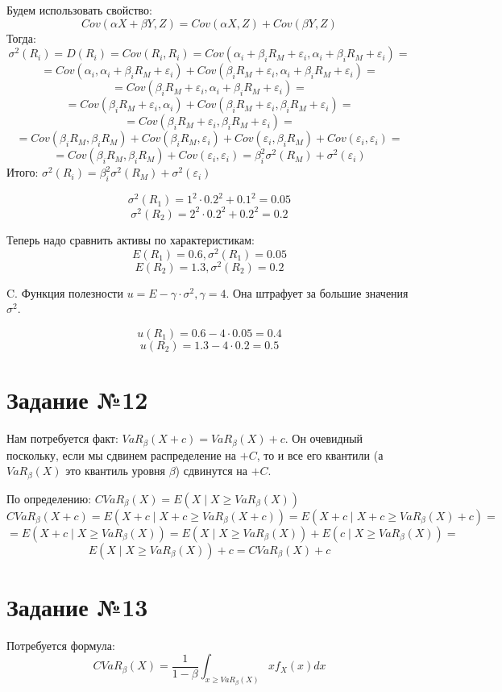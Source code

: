 \documentclass[a4paper,14pt]{extarticle}
\theoremstyle{definition}
\begin{document}
Будем использовать свойство: $$Cov(\alpha X + \beta Y, Z) = Cov(\alpha X, Z) + Cov(\beta Y, Z)$$
Тогда:
$$
\sigma^2(R_i) = D(R_i) = Cov(R_i, R_i) = Cov(\alpha_i + \beta_i R_M + \varepsilon_i, \alpha_i + \beta_i R_M + \varepsilon_i) =
$$
$$
=Cov(\alpha_i , \alpha_i + \beta_i R_M + \varepsilon_i) +
Cov(\beta_i R_M + \varepsilon_i , \alpha_i + \beta_i R_M + \varepsilon_i) =
$$
$$
=Cov(\beta_i R_M + \varepsilon_i , \alpha_i + \beta_i R_M + \varepsilon_i)=
$$
$$
=Cov(\beta_i R_M + \varepsilon_i , \alpha_i) +
Cov(\beta_i R_M + \varepsilon_i , \beta_i R_M + \varepsilon_i) = 
$$
$$
= Cov(\beta_i R_M + \varepsilon_i , \beta_i R_M + \varepsilon_i) =
$$
$$
= Cov(\beta_i R_M, \beta_i R_M) + Cov(\beta_i R_M, \varepsilon_i) + Cov(\varepsilon_i, \beta_i R_M) + Cov(\varepsilon_i, \varepsilon_i) =
$$
$$
= Cov(\beta_i R_M, \beta_i R_M) + Cov(\varepsilon_i, \varepsilon_i) = \beta_i^2 \sigma^2(R_M) + \sigma^2(\varepsilon_i)
$$
Итого: $\sigma^2(R_i) = \beta_i^2 \sigma^2(R_M) + \sigma^2(\varepsilon_i)$

$$\sigma^2(R_1) = 1^2 \cdot 0.2^2 + 0.1^2 = 0.05$$
$$\sigma^2(R_2) = 2^2 \cdot 0.2^2 + 0.2^2 = 0.2$$

Теперь надо сравнить активы по характеристикам:
$$E(R_1)= 0.6, \sigma^2(R_1)  = 0.05$$
$$E(R_2) =  1.3, \sigma^2(R_2)  = 0.2$$

C. Функция полезности $u=E-\gamma\cdot \sigma^2, \gamma=4$. Она штрафует за большие значения $\sigma^2$.

$$
u(R_1) = 0.6 - 4 \cdot 0.05 = 0.4
$$
$$
u(R_2) = 1.3 - 4 \cdot 0.2 = 0.5
$$

\section{Задание №12}
Нам потребуется факт: $VaR_\beta(X+c)=VaR_\beta(X)+c$. 
Он очевидный поскольку, если мы сдвинем распределение на $+C$, то и все его квантили (а $VaR_\beta(X)$
это квантиль уровня $\beta$) сдвинутся на $+C$.

По определению: $CVaR_\beta(X) = E(X \mid X \geq VaR_\beta(X))$
$$
CVaR_\beta(X+c) = E(X+c \mid X+c \geq VaR_\beta(X+c)) = E(X+c \mid X+c \geq VaR_\beta(X)+c) =
$$
$$
= E(X+c \mid X \geq VaR_\beta(X)) = E(X \mid X \geq VaR_\beta(X)) + E(c \mid X \geq VaR_\beta(X))=
$$
$$
E(X \mid X \geq VaR_\beta(X)) + c = CVaR_\beta(X) + c
$$

\section{Задание №13}
Потребуется формула:
$$
CVaR_\beta(X) = \dfrac{1}{1-\beta}\int_{x \geq VaR_\beta(X)} x f_X(x) dx
$$
\end{document}
